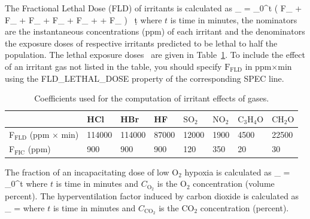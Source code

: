 \documentclass[11pt]{book}
\begin{document}
The Fractional Lethal Dose (FLD) of irritants is calculated as
\be
{}_ = \int_0^t \left(
        {F_} +
        {F_} +
         {F_} +
       {F_} +
       {F_} +
     +
      {F_}
    \right) \, \d t
\ee
where $t$ is time in minutes, the nominators are the instantaneous concentrations (ppm) of each irritant and
the denominators the exposure doses of respective irritants predicted to be lethal to half the population.
The lethal exposure doses~\cite{SFPE:Purser} are given in Table~\ref{tbl:FIC}. To include the effect of an irritant gas not listed in the table,
you should specify $\mathrm{F_{FLD}}$ in ppm$\times$min using the {\ct FLD\_LETHAL\_DOSE} property of the corresponding {\ct SPEC} line.
\begin{table}[ht]
\caption[Coefficients used for the computation of irritant effects of gases]{Coefficients used for the computation of irritant effects of gases.}
\label{tbl:FIC}
\begin{center}
\begin{tabular}{|l|l|l|l|l|l|l|l|}
\hline & HCl & HBr & HF & $\mathrm{SO_2}$ & $\mathrm{NO_2}$ & $\mathrm{C_3H_4O}$ & $\mathrm{CH_2O}$  \\ \hline \hline
F${}_\mathrm{FLD}$ (ppm $\times$ min) & 114000 & 114000 & 87000 & 12000 & 1900 & 4500 & 22500 \\
F${}_\mathrm{FIC}$ (ppm) & 900 & 900 & 900 & 120 & 350 & 20 & 30 \\ \hline
\end{tabular}
\end{center}
\end{table}

The fraction of an incapacitating dose of low O${}_2$ hypoxia is calculated as
\be
{}_ =  \int_0^t 
\ee
where $t$ is time in minutes and $C_\mathrm{O_2}$ is the O${}_2$ concentration (volume percent).
The hyperventilation factor induced by carbon dioxide is calculated as
\be
{}_ =  \label{co2hyp}
\ee
where $t$ is time in minutes and $C_\mathrm{CO_2}$ is the CO${}_2$ concentration (percent).
\end{document}

